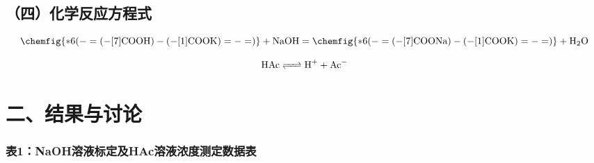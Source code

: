 \documentclass[a4paper,12pt]{article}
\begin{document}
\subsection*{（四）化学反应方程式}
$$
\rm\chemfig{*6(-=(-[7]COOH)-(-[1]COOK)=-=)}+NaOH=\chemfig{*6(-=(-[7]COONa)-(-[1]COOK)=-=)}+H_2O
$$

$$
\ce{HAc <=> H^+ + Ac^-}
$$

\section*{二、结果与讨论}

\subsubsection*{表1：NaOH溶液标定及HAc溶液浓度测定数据表}
\renewcommand\arraystretch{1}
\fontsize{10pt}{12pt}\selectfont
\noindent
\end{document}
